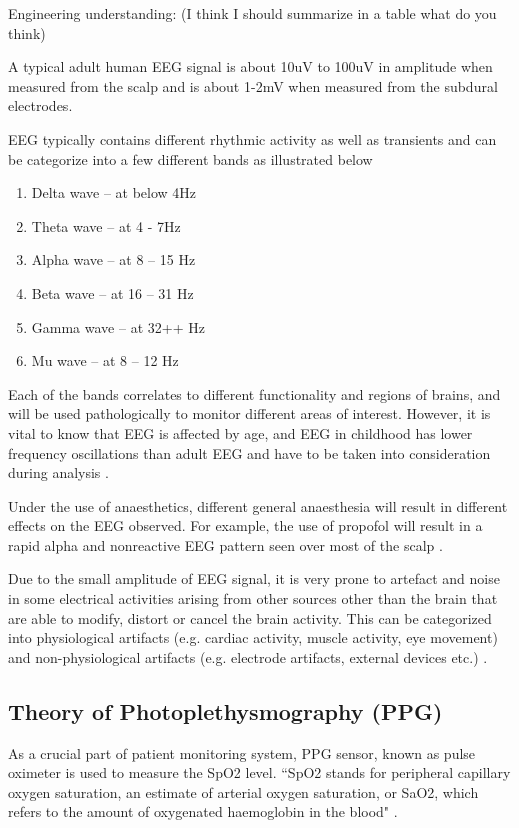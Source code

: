 Engineering understanding: (I think I should summarize in a table what do you think)

A typical adult human EEG signal is about 10uV to 100uV in amplitude when measured from the scalp and is about 1-2mV when measured from the subdural electrodes. 

EEG typically contains different rhythmic activity as well as transients and can be categorize into a few different bands as illustrated below

\begin{enumerate}
	\item Delta wave – at below 4Hz
	\item Theta wave – at 4 - 7Hz
	\item Alpha wave – at 8 – 15 Hz
	\item Beta wave – at 16 – 31 Hz
	\item Gamma wave – at 32++ Hz
	\item Mu wave – at 8 – 12 Hz
\end{enumerate}


Each of the bands correlates to different functionality and regions of brains, and will be used pathologically to monitor different areas of interest. However, it is vital to know that EEG is affected by age, and EEG in childhood has lower frequency oscillations than adult EEG and have to be taken into consideration during analysis \cite{jiahui3}. 

Under the use of anaesthetics, different general anaesthesia will result in different effects on the EEG observed. For example, the use of propofol will result in a rapid alpha and nonreactive EEG pattern seen over most of the scalp \cite{jiahui4}. 

Due to the small amplitude of EEG signal, it is very prone to artefact and noise in some electrical activities arising from other sources other than the brain that are able to modify, distort or cancel the brain activity. This can be categorized into physiological artifacts (e.g. cardiac activity, muscle activity, eye movement) and non-physiological artifacts (e.g. electrode artifacts, external devices etc.) \cite{jiahui5}.


\subsection{Theory of Photoplethysmography (PPG)}

As a crucial part of patient monitoring system, PPG sensor, known as pulse oximeter is used to measure the SpO2 level. “SpO2 stands for peripheral capillary oxygen saturation, an estimate of arterial oxygen saturation, or SaO2, which refers to the amount of oxygenated haemoglobin in the blood" \cite{george1}.

